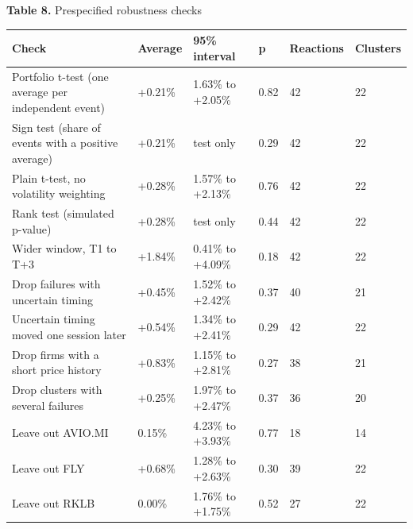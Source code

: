 \documentclass[12pt,a4paper]{article}
\begin{document}
\par\noindent\begin{minipage}{\textwidth}\hypertarget{tab-rob}{}
\textbf{Table 8.} Prespecified robustness checks

{\small\setlength{\tabcolsep}{4pt}\begin{tabularx}{\textwidth}{Xlllll}
\toprule
\textbf{Check} & \textbf{Average} & \textbf{95\% interval} & \textbf{p} & \textbf{Reactions} & \textbf{Clusters} \\
\midrule
Portfolio t-test (one average per independent event) & +0.21\% & \textminus{}1.63\% to +2.05\% & 0.82 & 42 & 22 \\
Sign test (share of events with a positive average) & +0.21\% & test only & 0.29 & 42 & 22 \\
Plain t-test, no volatility weighting & +0.28\% & \textminus{}1.57\% to +2.13\% & 0.76 & 42 & 22 \\
Rank test (simulated p-value) & +0.28\% & test only & 0.44 & 42 & 22 \\
Wider window, T\textminus{}1 to T+3 & +1.84\% & \textminus{}0.41\% to +4.09\% & 0.18 & 42 & 22 \\
Drop failures with uncertain timing & +0.45\% & \textminus{}1.52\% to +2.42\% & 0.37 & 40 & 21 \\
Uncertain timing moved one session later & +0.54\% & \textminus{}1.34\% to +2.41\% & 0.29 & 42 & 22 \\
Drop firms with a short price history & +0.83\% & \textminus{}1.15\% to +2.81\% & 0.27 & 38 & 21 \\
Drop clusters with several failures & +0.25\% & \textminus{}1.97\% to +2.47\% & 0.37 & 36 & 20 \\
Leave out AVIO.MI & \textminus{}0.15\% & \textminus{}4.23\% to +3.93\% & 0.77 & 18 & 14 \\
Leave out FLY & +0.68\% & \textminus{}1.28\% to +2.63\% & 0.30 & 39 & 22 \\
Leave out RKLB & 0.00\% & \textminus{}1.76\% to +1.75\% & 0.52 & 27 & 22 \\
\bottomrule
\end{tabularx}}
\vspace{6pt}

\end{minipage}\par\vspace{4pt}
\end{document}
